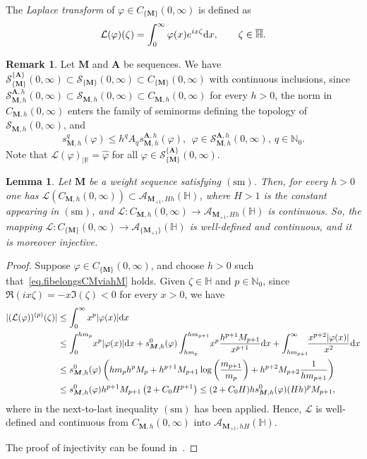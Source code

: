 \documentclass[12pt,a4paper]{article}
\newcommand{\N}{\mathbb{N}}
\newcommand{\R}{\mathbb{R}}
\newcommand{\HH}{\mathbb{H}}
\newcommand{\SMA}{\mathcal{S}^{\{\A\}}_{\{\M\}}}
\newcommand{\CM}{C_{\{\M\}}(0,\infty)}
\newcommand{\M}{{\boldsymbol{M}}}
\newcommand{\A}{{\boldsymbol{A}}}
\newcommand{\dx}{{\rm d}x }
\newcommand{\sm}{\operatorname{(sm)}}
\theoremstyle{plain}
\newtheorem{lemma}[theorem]{Lemma}
\theoremstyle{definition}
\newtheorem{remark}[theorem]{Remark}
\numberwithin{equation}{section}
\begin{document}
The \emph{Laplace transform} of $\varphi \in \CM$ is defined as
$$
\mathcal{L}(\varphi)(\zeta) =  \int_0^\infty \varphi(x)e^{ix\zeta}\dx, \qquad \zeta \in \overline{\HH}.
$$
\begin{remark}\label{rem.ContinuousInclusions}
Let $\M$ and $\A$ be sequences. We have $\SMA(0,\infty)\subset\mathcal{S}_{\{\M\}}(0,\infty)\subset\CM$ with continuous inclusions, since $\mathcal{S}_{\M,h}^{\A,h}(0,\infty)\subset\mathcal{S}_{\M,h}(0,\infty) \subset C_{\M,h}(0,\infty)$ for every $h>0$, the norm in $C_{\M,h}(0,\infty)$ enters the family of seminorms defining the topology of $\mathcal{S}_{\M,h}(0,\infty)$, and
$$
s_{\M,h}^q(\varphi)\le h^qA_qs_{\M,h}^{\A,h}(\varphi),\ \ \varphi\in\mathcal{S}_{\M,h}^{\A,h}(0,\infty),\ q\in\N_0.
$$
Note that $\mathcal{L}(\varphi)_{|\R} = \widehat{\varphi}$ for all $\varphi \in \SMA(0,\infty)$.
\end{remark}
\begin{lemma}\label{inj-lapl-dm}
Let $\M$ be a weight sequence satisfying $\sm$. Then, for every $h>0$ one has $\mathcal{L}(C_{\M,h}(0,\infty))\subset \mathcal{A}_{\M_{+1},Hh}(\HH)$, where $H>1$ is the constant appearing in $\sm$, and $\mathcal{L}\colon C_{\M,h}(0,\infty)\to \mathcal{A}_{\M_{+1},Hh}(\HH)$ is continuous. So, the mapping
$
\mathcal{L} : \CM \rightarrow \mathcal{A}_{\{\M_{+1}\}}(\HH)
$
is well-defined and continuous, and it is moreover injective.
\end{lemma}
\begin{proof}
Suppose $\varphi\in\CM$, and choose $h>0$ such that~\eqref{eq.fibelongsCMviahM} holds. Given
$\zeta\in\HH$ and $p\in\N_0$, since $\Re(ix\zeta)=-x\Im(\zeta)< 0$ for every $x> 0$, we have
\begin{align}
|(\mathcal{L}(\varphi))^{(p)}(\zeta)|&\le  \int_0^\infty x^p|\varphi(x)|\dx\label{eq.bound_Laplace_transform}\\
&\le \int_0^{hm_p}\! x^p |\varphi(x)|\dx+
s_{\M,h}^0(\varphi)\int_{hm_p}^{hm_{p+1}}\! x^p \frac{h^{p+1}M_{p+1}}{x^{p+1}}\dx
		+\int_{hm_{p+1}}^\infty \!\! \frac{x^{p+2}|\varphi(x)|}{x^2}\dx\nonumber\\
		&\le s_{\M,h}^0(\varphi)\left(hm_ph^pM_p+ h^{p+1}M_{p+1}\log\left(\frac{m_{p+1}}{m_p}\right)
		+h^{p+2}M_{p+2}\frac{1}{hm_{p+1}}\right)\nonumber\\
&\le s_{\M,h}^0(\varphi)h^{p+1}M_{p+1}\left(2+C_0H^{p+1}\right)\le
(2+C_0H)hs_{\M,h}^0(\varphi)(Hh)^pM_{p+1},\nonumber
\end{align}
where in the next-to-last inequality $\sm$ has been applied. Hence, $\mathcal{L}$ is well-defined and continuous from $C_{\M,h}(0,\infty)$ into $\mathcal{A}_{\M_{+1},hH}(\HH)$.

The proof of injectivity can be found in~\cite[Lemma 2.10]{DebrouwereetalMoment}.
\end{proof}
\end{document}
